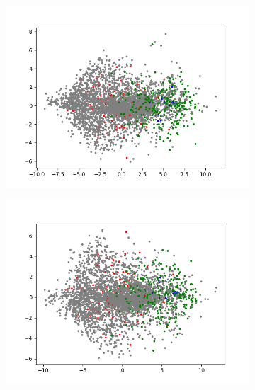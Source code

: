 \begin{figure}[H]
\begin{subfigure}{.25\textwidth}
        \includegraphics[width=\textwidth]{images/figures/experiments_latent/convolutional_dim128_PCA_classes.png}
    \end{subfigure}%
    \begin{subfigure}{.25\textwidth}
        \centering
        \includegraphics[width=\textwidth]{images/figures/experiments_latent/convolutional_dim50_PCA_classes.png}
    \end{subfigure}
    \begin{subfigure}{.25\textwidth}
        \centering

\end{subfigure}
\end{figure}
